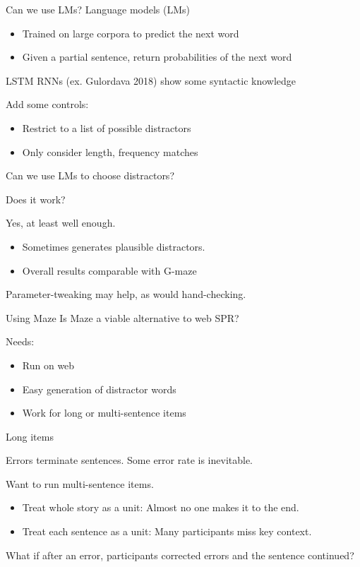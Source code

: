 \documentclass[12pt, xcolor=beamer,table,usenames,dvipsnames, ignorenonframetext, ngerman]{beamer}
\begin{document}
%
\begin{frame}{Can we use LMs?}
Language models (LMs)
\begin{itemize}
	\item Trained on large corpora to predict the next word
	\item Given a partial sentence, return probabilities of the next word
\end{itemize}

LSTM RNNs (ex. Gulordava 2018) show some syntactic knowledge %

Add some controls:
\begin{itemize}
\item Restrict to a list of possible distractors
\item Only consider length, frequency matches
\end{itemize}
	
\end{frame}
%
\begin{frame}{Can we use LMs to choose distractors?} 

Does it work? 

Yes, at least well enough.
\begin{itemize}
	\item Sometimes generates plausible distractors.
	\item Overall results comparable with G-maze %
\end{itemize} 
\medskip

Parameter-tweaking may help, as would hand-checking. 
\end{frame}
%
\begin{frame}{Using Maze}
	Is Maze a viable alternative to web SPR?
	
	Needs:
	\begin{itemize}
		\item Run on web %
		\item Easy generation of distractor words 
		\item Work for long or multi-sentence items %
	\end{itemize} 
	\pause
	
\end{frame}
%
%
\begin{frame}{Long items}
	
Errors terminate sentences. 
Some error rate is inevitable. 

Want to run multi-sentence items. 
\begin{itemize}
	\item Treat whole story as a unit: Almost no one makes it to the end.
	\item Treat each sentence as a unit:
	Many participants miss key context. 
\end{itemize}

What if after an error, participants corrected errors and the sentence continued?
	
\end{frame}
\end{document}
